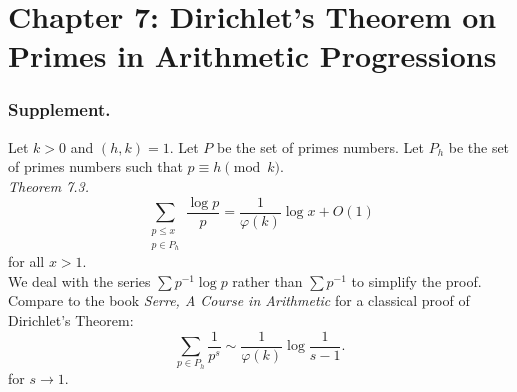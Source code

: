 \documentclass{article}
\begin{document}
\newpage
\section*{Chapter 7: Dirichlet's Theorem on Primes in Arithmetic Progressions \\}






\subsubsection*{Supplement.}

Let $k > 0$ and $(h,k) = 1$.
Let $P$ be the set of primes numbers.
Let $P_h$ be the set of primes numbers such that $p \equiv h \pmod k$.
\\


\emph{Theorem 7.3.}
\[
  \sum_{\substack{p \leq x \\ p \in P_h}} \frac{\log p}{p} = \frac{1}{\varphi(k)} \log x + O(1)
\]
for all $x > 1$. \\

We deal with the series $\sum p^{-1} \log p$ rather than $\sum p^{-1}$ to simplify the proof.
Compare to the book \emph{Serre, A Course in Arithmetic} for a classical proof of Dirichlet's Theorem:
\[
  \sum_{p \in P_h} \frac{1}{p^s} \sim \frac{1}{\varphi(k)} \log \frac{1}{s-1}.
\]
for $s \to 1$. \\
\end{document}
